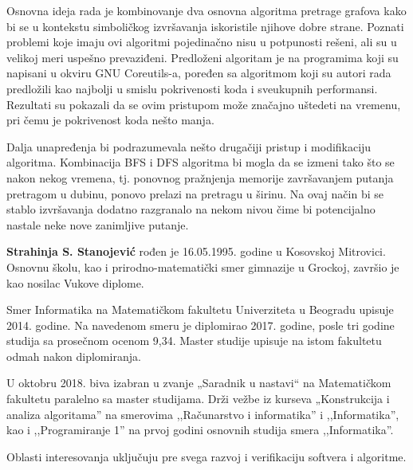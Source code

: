 \documentclass[12pt,oneside]{memoir}
\begin{document}
Osnovna ideja rada je kombinovanje dva osnovna algoritma pretrage grafova kako bi se u kontekstu simboličkog izvršavanja iskoristile njihove dobre strane. Poznati problemi koje imaju ovi algoritmi pojedinačno nisu u potpunosti rešeni, ali su u velikoj meri uspešno prevaziđeni. Predloženi algoritam je na programima koji su napisani u okviru GNU Coreutils-a, poređen sa algoritmom koji su autori rada predložili kao najbolji u smislu pokrivenosti koda i sveukupnih performansi. Rezultati su pokazali da se ovim pristupom može značajno uštedeti na vremenu, pri čemu je pokrivenost koda nešto manja.

Dalja unapređenja bi podrazumevala nešto drugačiji pristup i modifikaciju algoritma. Kombinacija BFS i DFS algoritma bi mogla da se izmeni tako što se nakon nekog vremena, tj. ponovnog pražnjenja memorije završavanjem putanja pretragom u dubinu, ponovo prelazi na pretragu u širinu. Na ovaj način bi se stablo izvršavanja dodatno razgranalo na nekom nivou čime bi potencijalno nastale neke nove zanimljive putanje.
\printbibliography[heading=bibintoc,title=\foreignlanguage{serbian}{Literatura}]

\backmatter

\begin{biografija}
\textbf{Strahinja S. Stanojević} rođen je 16.05.1995. godine u Kosovskoj Mitrovici. Osnovnu školu, kao i prirodno-matematički smer gimnazije u Grockoj, završio je kao nosilac Vukove diplome. 

Smer Informatika na Matematičkom fakultetu Univerziteta u Beogradu upisuje 2014. godine. Na navedenom smeru je diplomirao 2017. godine, posle tri godine studija sa prosečnom ocenom 9,34. Master studije upisuje na istom fakultetu odmah nakon diplomiranja. 

U oktobru 2018. biva izabran u zvanje „Saradnik u nastavi“ na Matematičkom fakultetu paralelno sa master studijama. Drži vežbe iz kurseva „Konstrukcija i analiza algoritama” na smerovima ,,Računarstvo i informatika'' i ,,Informatika'', kao i ,,Programiranje 1'' na prvoj godini osnovnih studija smera ,,Informatika''. 

Oblasti interesovanja uključuju pre svega razvoj i verifikaciju softvera i algoritme.
\end{biografija}
\end{document}

